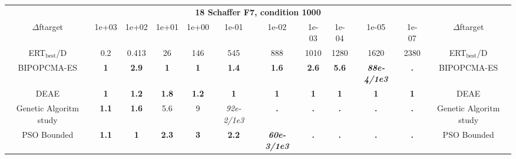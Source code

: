 \begin{tabular}{cccccccccccc}
 & \multicolumn{10}{c}{{\normalsize \textbf{18 Schaffer F7, condition 1000}}}\\
$\Delta$ftarget& 1e+03& 1e+02& 1e+01& 1e+00& 1e-01& 1e-02& 1e-03& 1e-04& 1e-05& 1e-07 & $\Delta$ftarget \\
ERT$_{\textrm{best}}$/D& 0.2& 0.413& 26& 146& 545& 888& 1010& 1280& 1620& 2380 & ERT$_{\textrm{best}}$/D \\
\hline
BIPOPCMA-ES & \textbf{1} & \textbf{2.9} & \textbf{1} & \textbf{1} & \textbf{1.4} & \textbf{1.6} & \textbf{2.6} & \textbf{5.6} & \textbf{\textit{88e-4}\textit{/1e3}} & \textbf{.} & BIPOPCMA-ES \cite{add_an_entry_for_BIPOPCMA-ES_in_bbob.bib}\\
DEAE & \textbf{1} & \textbf{1.2} & \textbf{1.8} & \textbf{1.2} & \textbf{1} & \textbf{1} & \textbf{1} & \textbf{1} & \textbf{1} & \textbf{1} & DEAE \cite{add_an_entry_for_DEAE_in_bbob.bib}\\
Genetic Algoritm study & \textbf{1.1} & \textbf{1.6} & 5.6 & 9 & \textit{92e-2}\textit{/1e3} & \textbf{.} & \textbf{.} & \textbf{.} & \textbf{.} & \textbf{.} & Genetic Algoritm study \cite{add_an_entry_for_Genetic Algoritm study_in_bbob.bib}\\
PSO Bounded & \textbf{1.1} & \textbf{1} & \textbf{2.3} & \textbf{3} & \textbf{2.2} & \textbf{\textit{60e-3}\textit{/1e3}} & \textbf{.} & \textbf{.} & \textbf{.} & \textbf{.} & PSO Bounded \cite{add_an_entry_for_PSO Bounded_in_bbob.bib}
\end{tabular}
